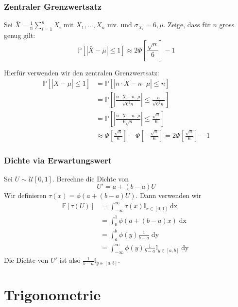 \documentclass[a4paper,10pt]{article}
\def\P{\mathbb{P}}
\def\E{\mathbb{E}}
\begin{document}
\subsubsection*{Zentraler Grenzwertsatz}
Sei \(\bar X = \frac{1}{n} \sum_{i=1}^n X_i\) mit \(X_1,...,X_n\) uiv. und \(\sigma_{X_i} = 6, \mu\). Zeige, dass für \(n\) gross genug gilt:
\[\P[|\bar X - \mu| \leq 1] \approx 2 \Phi \left[\frac{\sqrt{n}}{6} \right] - 1\]

\noindent
Hierfür verwenden wir den zentralen Grenzwertsatz:
\begin{align*}
	\P[|\bar X - \mu| \leq 1] & = \P[|n \cdot \bar X - n \cdot \mu| \leq n]                                                                                          \\
	                          & = \P \left[\left|\frac{n \cdot \bar X - n \cdot \mu}{\sqrt{6^2 n}}\right| \leq \frac{n}{\sqrt{6^2 n}}\right]                         \\
	                          & = \P \left[\left|\frac{n \cdot \bar X - n \cdot \mu}{6 \sqrt n}\right| \leq \frac{\sqrt n}{6}\right]                                 \\
	                          & \approx \Phi \left[ \frac{\sqrt n}{6} \right] - \Phi \left[ -\frac{\sqrt n}{6} \right] = 2 \Phi \left[ \frac{\sqrt n}{6} \right] - 1
\end{align*}

\subsubsection*{Dichte via Erwartungswert}
Sei \(U \sim \mathcal{U}[0,1]\). Berechne die Dichte von
\[U' = a + (b-a)U\]
Wir definieren \(\tau(x) = \phi(a +(b-a)U)\). Dann verwenden wir
\begin{align*}
	\E[\tau(U)] & = \int_{-\infty}^\infty \tau(x) \mathbb{I}_{x\in [0,1]}\mathop{dx}              \\
	            & = \int_0^1 \phi(a + (b-a)x) \mathop{dx}                                         \\
	            & = \int_a^b \phi(y)\frac{1}{b-a} \mathop{dy}                                     \\
	            & = \int_{-\infty}^\infty \phi(y)\frac{1}{b-a} \mathbb{I}_{y\in[a,b]} \mathop{dy}
\end{align*}
Die Dichte von \(U'\) ist also \(\frac{1}{b-a} \mathbb{I}_{y\in[a,b]}\).

\section{Trigonometrie}
\end{document}
